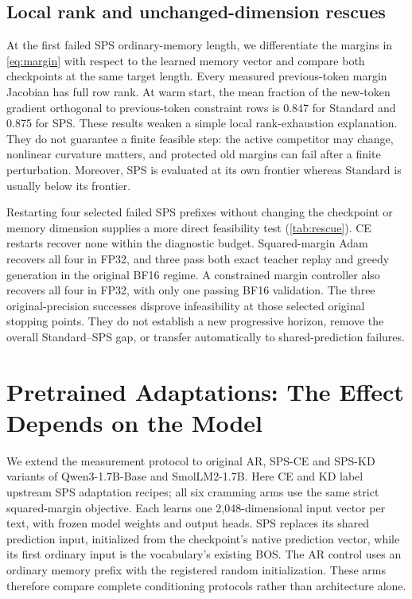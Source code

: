 \documentclass{article}
\begin{document}
\subsection{Local rank and unchanged-dimension rescues}
\label{sec:geometry}

At the first failed SPS ordinary-memory length, we differentiate the margins in \cref{eq:margin} with respect to the learned memory vector and compare both checkpoints at the same target length.
Every measured previous-token margin Jacobian has full row rank.
At warm start, the mean fraction of the new-token gradient orthogonal to previous-token constraint rows is 0.847 for Standard and 0.875 for SPS.
These results weaken a simple local rank-exhaustion explanation.
They do not guarantee a finite feasible step: the active competitor may change, nonlinear curvature matters, and protected old margins can fail after a finite perturbation.
Moreover, SPS is evaluated at its own frontier whereas Standard is usually below its frontier.

Restarting four selected failed SPS prefixes without changing the checkpoint or memory dimension supplies a more direct feasibility test (\cref{tab:rescue}).
CE restarts recover none within the diagnostic budget.
Squared-margin Adam recovers all four in FP32, and three pass both exact teacher replay and greedy generation in the original BF16 regime.
A constrained margin controller also recovers all four in FP32, with only one passing BF16 validation.
The three original-precision successes disprove infeasibility at those selected original stopping points.
They do not establish a new progressive horizon, remove the overall Standard--SPS gap, or transfer automatically to shared-prediction failures.

\section{Pretrained Adaptations: The Effect Depends on the Model}
\label{sec:pretrained}

We extend the measurement protocol to original AR, SPS-CE and SPS-KD variants of Qwen3-1.7B-Base and SmolLM2-1.7B.
Here CE and KD label upstream SPS adaptation recipes; all six cramming arms use the same strict squared-margin objective.
Each learns one 2,048-dimensional input vector per text, with frozen model weights and output heads.
SPS replaces its shared prediction input, initialized from the checkpoint's native prediction vector, while its first ordinary input is the vocabulary's existing BOS.
The AR control uses an ordinary memory prefix with the registered random initialization.
These arms therefore compare complete conditioning protocols rather than architecture alone.
\end{document}
